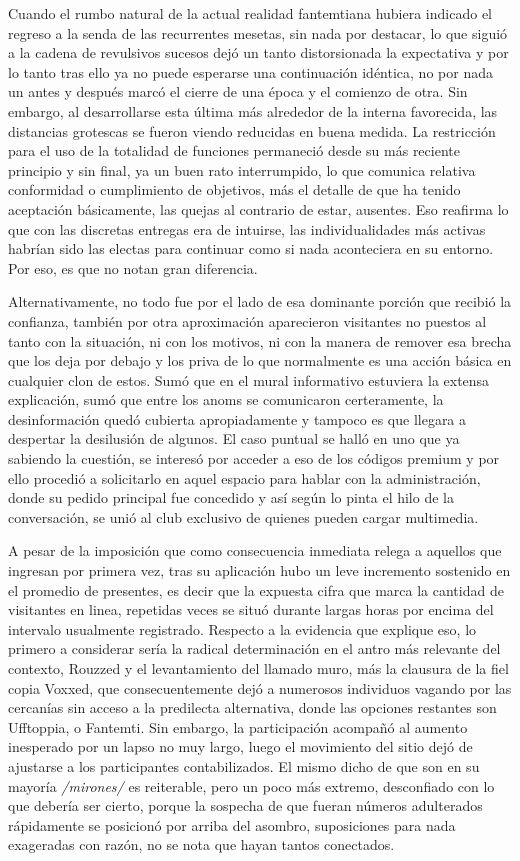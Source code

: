 \documentclass[
]{book}
\begin{document}
Cuando el rumbo natural de la actual realidad fantemtiana hubiera indicado el regreso a la senda de las recurrentes mesetas, sin nada por destacar, lo que siguió a la cadena de revulsivos sucesos dejó un tanto distorsionada la expectativa y por lo tanto tras ello ya no puede esperarse una continuación idéntica, no por nada un antes y después marcó el cierre de una época y el comienzo de otra. Sin embargo, al desarrollarse esta última más alrededor de la interna favorecida, las distancias grotescas se fueron viendo reducidas en buena medida. La restricción para el uso de la totalidad de funciones permaneció desde su más reciente principio y sin final, ya un buen rato interrumpido, lo que comunica relativa conformidad o cumplimiento de objetivos, más el detalle de que ha tenido aceptación básicamente, las quejas al contrario de estar, ausentes. Eso reafirma lo que con las discretas entregas era de intuirse, las individualidades más activas habrían sido las electas para continuar como si nada aconteciera en su entorno. Por eso, es que no notan gran diferencia.

Alternativamente, no todo fue por el lado de esa dominante porción que recibió la confianza, también por otra aproximación aparecieron visitantes no puestos al tanto con la situación, ni con los motivos, ni con la manera de remover esa brecha que los deja por debajo y los priva de lo que normalmente es una acción básica en cualquier clon de estos. Sumó que en el mural informativo estuviera la extensa explicación, sumó que entre los anoms se comunicaron certeramente, la desinformación quedó cubierta apropiadamente y tampoco es que llegara a despertar la desilusión de algunos. El caso puntual se halló en uno que ya sabiendo la cuestión, se interesó por acceder a eso de los códigos premium y por ello procedió a solicitarlo en aquel espacio para hablar con la administración, donde su pedido principal fue concedido y así según lo pinta el hilo de la conversación, se unió al club exclusivo de quienes pueden cargar multimedia.

A pesar de la imposición que como consecuencia inmediata relega a aquellos que ingresan por primera vez, tras su aplicación hubo un leve incremento sostenido en el promedio de presentes, es decir que la expuesta cifra que marca la cantidad de visitantes en linea, repetidas veces se situó durante largas horas por encima del intervalo usualmente
registrado. Respecto a la evidencia que explique eso, lo primero a considerar sería la radical determinación en el antro más relevante del contexto, Rouzzed y el levantamiento del llamado muro, más la clausura de la fiel copia Voxxed, que consecuentemente dejó a numerosos individuos vagando por las cercanías sin acceso a la predilecta alternativa, donde las opciones restantes son Ufftoppia, o Fantemti. Sin embargo, la participación acompañó al aumento inesperado por un lapso no muy largo, luego el movimiento del sitio dejó de ajustarse a los participantes contabilizados. El mismo dicho de que son en su mayoría \emph{/mirones/} es reiterable, pero un poco más extremo, desconfiado con lo que debería ser cierto, porque la sospecha de que fueran números adulterados rápidamente se posicionó por arriba del asombro, suposiciones para nada exageradas con razón, no se nota que hayan tantos conectados.
\end{document}
